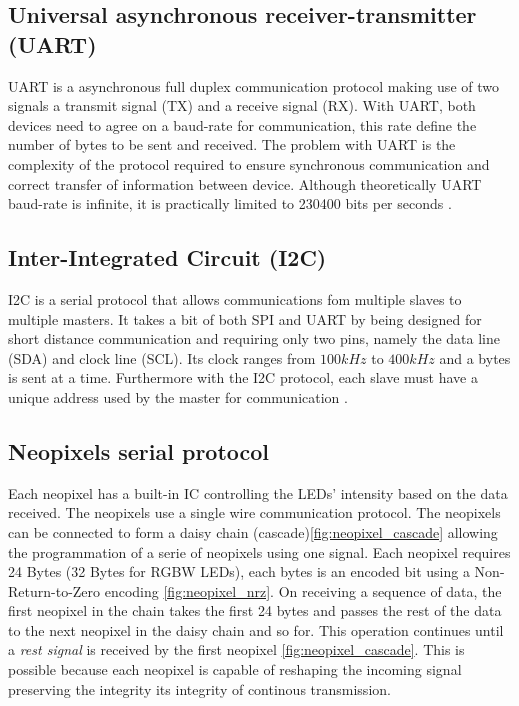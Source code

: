 \subsection{Universal asynchronous receiver-transmitter (UART)}
UART is a asynchronous full duplex communication protocol making use of two signals a transmit signal (TX) and a receive signal (RX). With UART, both devices need to agree on a baud-rate for communication, this rate define the number of bytes to be sent and received. The problem with UART is the complexity of the protocol required to ensure synchronous communication and correct transfer of information between device. Although theoretically UART baud-rate is infinite, it is practically limited to 230400 bits per seconds \cite{uart}.   

\subsection{Inter-Integrated Circuit (I2C)}
I2C is a serial protocol that allows communications fom multiple slaves to multiple masters. It takes a bit of both SPI and UART by being designed for short distance communication and requiring only two pins, namely the data line (SDA) and clock line (SCL). Its clock ranges from $100kHz$ to $400kHz$ and a bytes is sent at a time. Furthermore with the I2C protocol, each slave must have a unique address used by the master for communication \cite{i2c}.  

\subsection{Neopixels serial protocol}
Each neopixel has a built-in IC controlling the LEDs' intensity based on the data received. The neopixels use a single wire communication protocol. The neopixels can be connected to form a daisy chain (cascade)\cref{fig:neopixel_cascade} allowing the programmation of a serie of neopixels using one signal. Each neopixel requires 24 Bytes (32 Bytes for RGBW LEDs), each bytes is an encoded bit using a Non-Return-to-Zero encoding \cref{fig:neopixel_nrz}. On receiving a sequence of data, the first neopixel in the chain takes the first 24 bytes and passes the rest of the data to the next neopixel in the daisy chain and so for. This operation continues until a \textit{rest signal} is received by the first neopixel \cref{fig:neopixel_cascade}. This is possible because each neopixel is capable of reshaping the incoming signal preserving the integrity its integrity of continous transmission.

